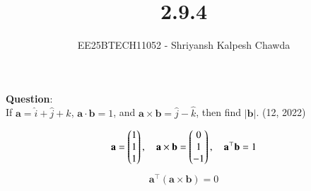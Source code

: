 \documentclass[journal]{IEEEtran}
\begin{document}
	
	
	\vspace{3cm}
	
	\title{2.9.4}
	\author{EE25BTECH11052 - Shriyansh Kalpesh Chawda}
	
	{\let\newpage\relax\maketitle}
	
	\renewcommand{\thefigure}{\theenumi}
	\renewcommand{\thetable}{\theenumi}
	\setlength{\intextsep}{10pt} 
	
	\renewcommand{\thetable}{\theenumi}
	
	\textbf{Question}:\\
	If $\mathbf{a} = \hat{i} + \hat{j} + \hat{k}$, $\mathbf{a} \cdot \mathbf{b} = 1$, and $\mathbf{a} \times \mathbf{b} = \hat{j} - \hat{k}$, then find $|\mathbf{b}|$. \hfill{(12, 2022)}
	
	\solution	
	\begin{align}
		\mathbf{a} = \begin{pmatrix}1\\1\\1\end{pmatrix}, \quad \mathbf{a} \times \mathbf{b} = \begin{pmatrix}0\\1\\-1\end{pmatrix}, \quad \mathbf{a}^\top\mathbf{b} = 1
	\end{align}
	\begin{align}
		\mathbf{a}^\top(\mathbf{a} \times \mathbf{b}) = 0
	\end{align}
	
\end{document}
